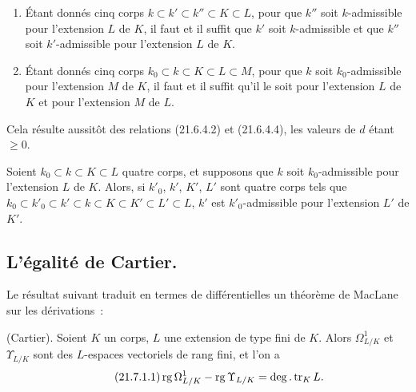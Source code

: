 \begin{corollary}[21.6.5]
\label{0.21.6.5-fr}
\begin{enumerate}
  \item[\textup{(i)}] Étant donnés cinq corps $k\subset k'\subset k''\subset K\subset L$,
  pour que $k''$ soit $k$-admissible pour l'extension $L$ de $K$, il faut et
  il suffit que $k'$ soit $k$-admissible et que $k''$ soit $k'$-admissible
  pour l'extension $L$ de $K$.
  \item[\textup{(ii)}] Étant donnés cinq corps
  $k_0\subset k\subset K\subset L\subset M$, pour que $k$ soit
  $k_0$-admissible pour l'extension $M$ de $K$, il faut et il suffit qu'il le
  soit pour l'extension $L$ de $K$ et pour l'extension $M$ de $L$.
\end{enumerate}
\end{corollary}

Cela résulte aussitôt des relations (21.6.4.2) et (21.6.4.4), les valeurs de
$d$ étant $\geqslant0$.

\begin{corollary}[21.6.6]
\label{0.21.6.6-fr}
Soient $k_0\subset k\subset K\subset L$ quatre corps, et supposons que $k$
soit $k_0$-admissible pour l'extension $L$ de $K$. Alors, si $k'_0$, $k'$,
$K'$, $L'$ sont quatre corps tels que
$k_0\subset k'_0\subset k'\subset k\subset K\subset K'\subset L'\subset L$,
$k'$ est $k'_0$-admissible pour l'extension $L'$ de $K'$.
\end{corollary}

\subsection{L'égalité de Cartier.}
\label{subsection:0.21.7-fr}

Le résultat suivant traduit en termes de différentielles un théorème de
MacLane sur les dérivations~:

\begin{theorem}[21.7.1]
\label{0.21.7.1-fr}
\textnormal{(Cartier).}
Soient $K$ un corps, $L$ une extension de type fini de $K$. Alors
$\Omega^1_{L/K}$ et $\Upsilon_{L/K}$ sont des $L$-espaces vectoriels de rang
fini, et l'on a
\begin{equation}
\tag{21.7.1.1}
\label{0.21.7.1.1-fr}
\operatorname{rg}\Omega^1_{L/K}-\operatorname{rg}\Upsilon_{L/K}
=\deg.\operatorname{tr}_K L.
\end{equation}
\end{theorem}

